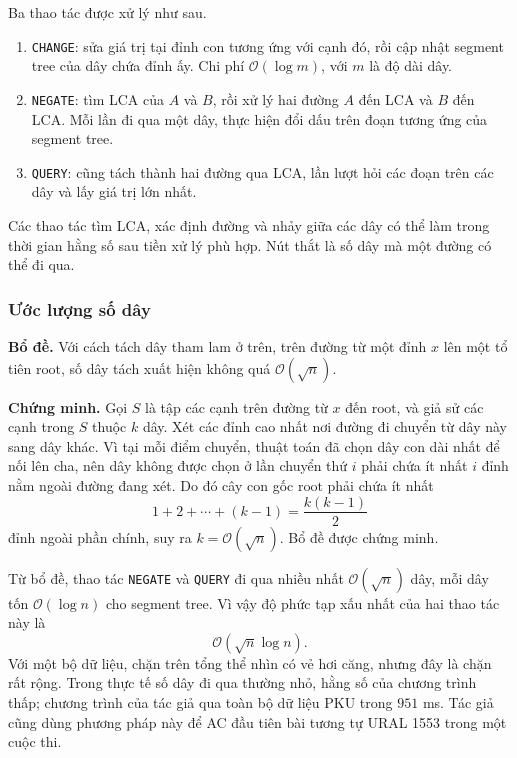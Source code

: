 \documentclass[11pt]{article}
\newcommand{\Oh}{\mathcal{O}}
\begin{document}
Ba thao tác được xử lý như sau.
\begin{enumerate}
  \item \texttt{CHANGE}: sửa giá trị tại đỉnh con tương ứng với cạnh đó, rồi
  cập nhật segment tree của dây chứa đỉnh ấy. Chi phí \(\Oh(\log m)\), với
  \(m\) là độ dài dây.
  \item \texttt{NEGATE}: tìm LCA của \(A\) và \(B\), rồi xử lý hai đường
  \(A\) đến LCA và \(B\) đến LCA. Mỗi lần đi qua một dây, thực hiện đổi dấu
  trên đoạn tương ứng của segment tree.
  \item \texttt{QUERY}: cũng tách thành hai đường qua LCA, lần lượt hỏi các
  đoạn trên các dây và lấy giá trị lớn nhất.
\end{enumerate}

Các thao tác tìm LCA, xác định đường và nhảy giữa các dây có thể làm trong
thời gian hằng số sau tiền xử lý phù hợp. Nút thắt là số dây mà một đường có
thể đi qua.

\subsubsection{Ước lượng số dây}

\textbf{Bổ đề.} Với cách tách dây tham lam ở trên, trên đường từ một đỉnh
\(x\) lên một tổ tiên \(\text{root}\), số dây tách xuất hiện không quá
\(\Oh(\sqrt n)\).

\textbf{Chứng minh.} Gọi \(S\) là tập các cạnh trên đường từ \(x\) đến
\(\text{root}\), và giả sử các cạnh trong \(S\) thuộc \(k\) dây. Xét các
đỉnh cao nhất nơi đường đi chuyển từ dây này sang dây khác. Vì tại mỗi điểm
chuyển, thuật toán đã chọn dây con dài nhất để nối lên cha, nên dây không
được chọn ở lần chuyển thứ \(i\) phải chứa ít nhất \(i\) đỉnh nằm ngoài
đường đang xét. Do đó cây con gốc \(\text{root}\) phải chứa ít nhất
\[
  1+2+\cdots+(k-1)=\frac{k(k-1)}{2}
\]
đỉnh ngoài phần chính, suy ra \(k=\Oh(\sqrt n)\). Bổ đề được chứng minh.

Từ bổ đề, thao tác \texttt{NEGATE} và \texttt{QUERY} đi qua nhiều nhất
\(\Oh(\sqrt n)\) dây, mỗi dây tốn \(\Oh(\log n)\) cho segment tree. Vì vậy
độ phức tạp xấu nhất của hai thao tác này là
\[
  \Oh(\sqrt n\log n).
\]
Với một bộ dữ liệu, chặn trên tổng thể nhìn có vẻ hơi căng, nhưng đây là
chặn rất rộng. Trong thực tế số dây đi qua thường nhỏ, hằng số của chương
trình thấp; chương trình của tác giả qua toàn bộ dữ liệu PKU trong \(951\)
ms. Tác giả cũng dùng phương pháp này để AC đầu tiên bài tương tự URAL 1553
trong một cuộc thi.
\end{document}
